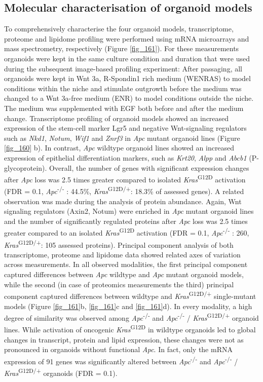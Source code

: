 \begin{flushleft}
\subsection{Molecular characterisation of organoid models}
To comprehensively characterise the four organoid models, transcriptome, proteome and lipidome profiling were performed using mRNA microarrays and mass spectrometry, respectively (Figure \ref{fig_161}). For these measurements organoids were kept in the same culture condition and duration that were used during the subsequent image-based profiling experiment: After passaging, all organoids were kept in Wnt 3a, R-Spondin1 rich medium (WENRAS) to model conditions within the niche and stimulate outgrowth before the medium was changed to a Wnt 3a-free medium (ENR) to model conditions outside the niche. The medium was supplemented with EGF both before and after the medium change. Transcriptome profiling of organoid models showed an increased expression of the stem-cell marker Lgr5 and negative Wnt-signaling regulators such as \textit{Nkd1}, \textit{Notum}, \textit{Wif1} and \textit{Znrf3} in \textit{Apc} mutant organoid lines (Figure \ref{fig_160} b). In contrast, \textit{Apc} wildtype organoid lines showed an increased expression of epithelial differentiation markers, such as \textit{Krt20}, \textit{Alpp} and \textit{Abcb1} (P-glycoprotein). Overall, the number of genes with significant expression changes after \textit{Apc} loss was 2.5 times greater compared to isolated \textit{Kras}\textsuperscript{G12D} activation (FDR = 0.1, \textit{Apc}\textsuperscript{-/-} : 44.5\%, \textit{Kras}\textsuperscript{G12D/+}: 18.3\% of assessed genes). A related observation was made during the analysis of protein abundance. Again, Wnt signaling regulators (Axin2, Notum) were enriched in \textit{Apc} mutant organoid lines and the number of significantly regulated proteins after \textit{Apc} loss was 2.5 times greater compared to an isolated \textit{Kras}\textsuperscript{G12D} activation (FDR = 0.1, \textit{Apc}\textsuperscript{-/-} : 260, \textit{Kras}\textsuperscript{G12D/+}: 105 assessed proteins). Principal component analysis of both transcriptome, proteome and lipidome data showed related axes of variation across measurements. In all observed modalities, the first principal component captured differences between \textit{Apc} wildtype and \textit{Apc} mutant organoid models, while the second (in case of proteomics measurements the third) principal component captured differences between wildtype and \textit{Kras}\textsuperscript{G12D/+} single-mutant models (Figure \ref{fig_161}b, \ref{fig_161}c and \ref{fig_161}d). In every modality, a high degree of similarity was observed among \textit{Apc}\textsuperscript{-/-}  and \textit{Apc}\textsuperscript{-/-} / \textit{Kras}\textsuperscript{G12D/+} organoid lines. While activation of oncogenic \textit{Kras}\textsuperscript{G12D} in wildtype organoids led to global changes in transcript, protein and lipid expression, these changes were not as pronounced in organoids without functional \textit{Apc}. In fact, only the mRNA expression of 91 genes was significantly altered between \textit{Apc}\textsuperscript{-/-}  and \textit{Apc}\textsuperscript{-/-} / \textit{Kras}\textsuperscript{G12D/+} organoids (FDR = 0.1). 


\end{flushleft}
